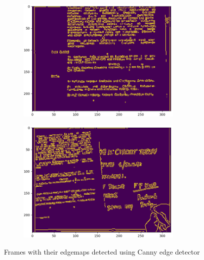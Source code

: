 \documentclass[journal]{IEEEtran}
\begin{document}
\begin{figure}[t]
	\begin{subfigure}{0.49\textwidth}
		\centering
		\includegraphics[height = 6cm]{Images/frameCanny.png}
	\end{subfigure}
	\hspace{1mm}
	\begin{subfigure}{0.49\textwidth}
		\centering
		\includegraphics[height = 6cm]{Images/frameCanny1.png}
	\end{subfigure}
	
	\caption{Frames with their edgemaps detected using Canny edge detector}
	\label{fig: canny}
\end{figure}
\end{document}
